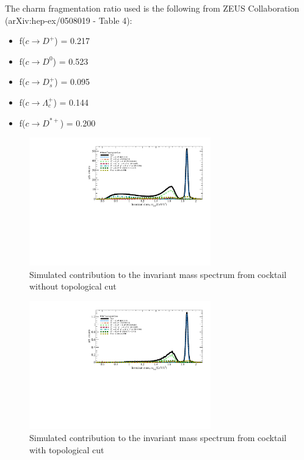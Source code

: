 The charm fragmentation ratio used is the following from ZEUS Collaboration (arXiv:hep-ex/0508019 - Table 4):

\begin{itemize}
\item f($c \rightarrow D^+$) = 0.217 
\item f($c \rightarrow D^0$) = 0.523 
\item f($c \rightarrow D^+_s$) = 0.095
\item f($c \rightarrow \Lambda^+_c$) = 0.144
\item f($c \rightarrow D^{*+}$) = 0.200
\end{itemize}

\begin{figure}[htbp]
\centering
\includegraphics[keepaspectratio,width=0.7\textwidth,angle=0]{figure/Run14_D0HFT/D0Bump_without_topo.pdf}
\caption{Simulated contribution to the invariant mass spectrum from cocktail without topological cut}
\label{fig:cocktail1}
\end{figure}

\begin{figure}[htbp]
\centering
\includegraphics[keepaspectratio,width=0.7\textwidth,angle=0]{figure/Run14_D0HFT/D0Bump_with_topo.pdf}
\caption{Simulated contribution to the invariant mass spectrum from cocktail with topological cut}
\label{fig:cocktail2}
\end{figure}


